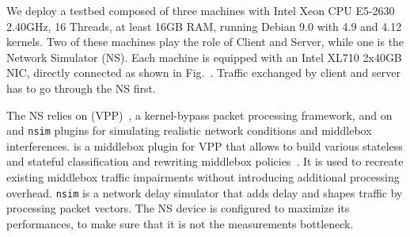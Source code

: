 
 We deploy a testbed composed of three machines with Intel Xeon CPU E5-2630
2.40GHz, 16 Threads, at least 16GB RAM, running Debian 9.0 with 4.9 and
4.12 kernels. Two of these machines play the role of Client and Server,
while one is the Network Simulator (NS). Each machine is equipped with an
Intel XL710 2x40GB NIC, directly connected as shown in Fig.~.
Traffic exchanged by client and server has to go through the NS first.

The NS relies on  (VPP)~\cite{vpp}, a
kernel-bypass packet processing framework, and on \mmb and \texttt{nsim}
plugins for simulating realistic network conditions and middlebox
interferences. \mmb is a middlebox plugin for VPP that allows to build various
stateless and stateful classification and rewriting middlebox
policies~\cite{edeline2019mmb}. It is used to recreate existing middlebox
traffic impairments without introducing additional processing overhead.
\texttt{nsim} is a network delay simulator that adds delay and shapes traffic
by processing packet vectors. The NS device is configured to maximize
its performances, to make sure that it is not the measurements bottleneck.
